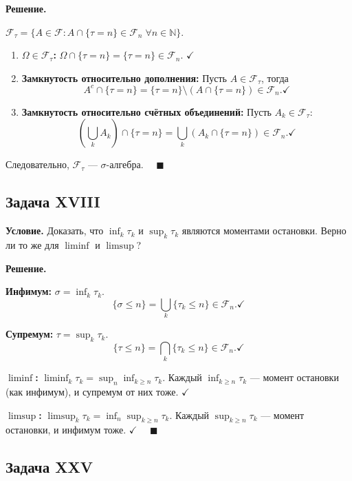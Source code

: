 \documentclass[12pt,a4paper]{article}
\theoremstyle{zadacha}
\begin{document}
\medskip
\textbf{Решение.}

$\mathcal{F}_\tau = \{A \in \mathcal{F} : A \cap \{\tau = n\} \in \mathcal{F}_n \;\forall n \in \mathbb{N}\}$.

\begin{enumerate}
  \item \textbf{$\Omega \in \mathcal{F}_\tau$:} $\Omega \cap \{\tau = n\} = \{\tau = n\} \in \mathcal{F}_n$. $\checkmark$

  \item \textbf{Замкнутость относительно дополнения:} Пусть $A \in \mathcal{F}_\tau$, тогда
  \[A^c \cap \{\tau = n\} = \{\tau = n\} \setminus (A \cap \{\tau = n\}) \in \mathcal{F}_n.\checkmark\]

  \item \textbf{Замкнутость относительно счётных объединений:} Пусть $A_k \in \mathcal{F}_\tau$:
  \[\left(\bigcup_k A_k\right) \cap \{\tau = n\} = \bigcup_k (A_k \cap \{\tau = n\}) \in \mathcal{F}_n. \checkmark\]
\end{enumerate}

Следовательно, $\mathcal{F}_\tau$ --- $\sigma$-алгебра. $\quad\blacksquare$

\subsection*{Задача XVIII}

\textbf{Условие.} Доказать, что $\inf_k \tau_k$ и $\sup_k \tau_k$ являются моментами остановки. Верно ли то же для $\liminf$ и $\limsup$?

\medskip
\textbf{Решение.}

\textbf{Инфимум:} $\sigma = \inf_k \tau_k$.
\[
\{\sigma \leq n\} = \bigcup_k \{\tau_k \leq n\} \in \mathcal{F}_n. \checkmark
\]

\textbf{Супремум:} $\tau = \sup_k \tau_k$.
\[
\{\tau \leq n\} = \bigcap_k \{\tau_k \leq n\} \in \mathcal{F}_n. \checkmark
\]

\textbf{$\liminf$:} $\liminf_k \tau_k = \sup_n \inf_{k \geq n} \tau_k$. Каждый $\inf_{k \geq n} \tau_k$ --- момент остановки (как инфимум), и супремум от них тоже. $\checkmark$

\textbf{$\limsup$:} $\limsup_k \tau_k = \inf_n \sup_{k \geq n} \tau_k$. Каждый $\sup_{k \geq n} \tau_k$ --- момент остановки, и инфимум тоже. $\checkmark$ $\quad\blacksquare$

\subsection*{Задача XXV}
\end{document}
